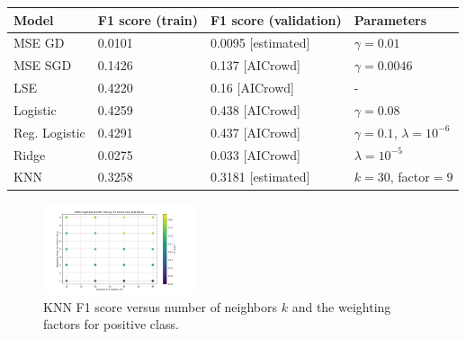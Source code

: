 \documentclass[10pt,conference,compsocconf]{IEEEtran}
\begin{document}
\noindent\begin{minipage}{\textwidth}
\centering
\begin{tabular}[c]{|l||l|l|l|}
  \hline
  Model & F1 score (train) & F1 score (validation) & Parameters \\
  \hline
  MSE GD & 0.0101 & 0.0095 [estimated] & $\gamma=0.01$ \\ 
  MSE SGD & 0.1426 & 0.137 [AICrowd] & $\gamma=0.0046$ \\
  LSE & 0.4220 & 0.16 [AICrowd] & - \\
  Logistic & 0.4259 & 0.438 [AICrowd] & $\gamma=0.08$ \\
  Reg. Logistic & 0.4291 &  0.437 [AICrowd] & $\gamma=0.1$, $\lambda=10^{-6}$ \\
  Ridge & 0.0275 & 0.033 [AICrowd] & $\lambda=10^{-5}$ \\
  KNN & 0.3258 & 0.3181 [estimated] & $k=30$, factor$=9$ \\
  \hline
\end{tabular}
\label{tab:models_comparison}
\end{minipage}

\vspace{0.3 cm}

\begin{figure}
    \centering
    \includegraphics[width=0.4\textwidth]{KNN_F1_Scores_CV1.png}  

    \caption{KNN F1 score versus number of neighbors $k$ and the weighting factors for positive class.}

    \label{fig:KNN}  

\end{figure}
\end{document}
